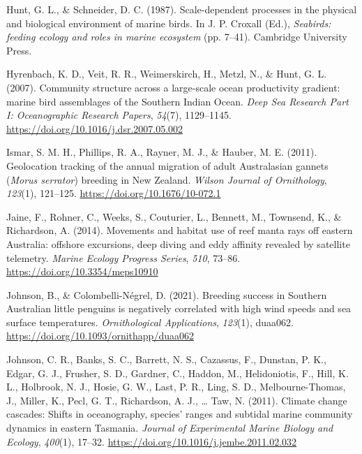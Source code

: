 \documentclass{article}
\newlength{\cslhangindent}
\newlength{\cslentryspacingunit} %
\newenvironment{CSLReferences}[2] %
 {%
  \setlength{\parindent}{0pt}
  \ifodd #1
  \let\oldpar\par
  \def\par{\hangindent=\cslhangindent\oldpar}
  \fi
  \setlength{\parskip}{#2\cslentryspacingunit}
 }%
 {}
\begin{document}
\begin{linenumbers}
\begin{CSLReferences}{1}{0}
\leavevmode{}%
Hunt, G. L., \& Schneider, D. C. (1987). Scale-dependent processes in the physical and biological environment of marine birds. In J. P. Croxall (Ed.), \emph{Seabirds: feeding ecology and roles in marine ecosystem} (pp. 7--41). Cambridge University Press.

\leavevmode{}%
Hyrenbach, K. D., Veit, R. R., Weimerskirch, H., Metzl, N., \& Hunt, G. L. (2007). Community structure across a large-scale ocean productivity gradient: marine bird assemblages of the Southern Indian Ocean. \emph{Deep Sea Research Part I: Oceanographic Research Papers}, \emph{54}(7), 1129--1145. \url{https://doi.org/10.1016/j.dsr.2007.05.002}

\leavevmode{}%
Ismar, S. M. H., Phillips, R. A., Rayner, M. J., \& Hauber, M. E. (2011). Geolocation tracking of the annual migration of adult Australasian gannets ({\emph{Morus serrator}}) breeding in New Zealand. \emph{Wilson Journal of Ornithology}, \emph{123}(1), 121--125. \url{https://doi.org/10.1676/10-072.1}

\leavevmode{}%
Jaine, F., Rohner, C., Weeks, S., Couturier, L., Bennett, M., Townsend, K., \& Richardson, A. (2014). Movements and habitat use of reef manta rays off eastern Australia: offshore excursions, deep diving and eddy affinity revealed by satellite telemetry. \emph{Marine Ecology Progress Series}, \emph{510}, 73--86. \url{https://doi.org/10.3354/meps10910}

\leavevmode{}%
Johnson, B., \& Colombelli-Négrel, D. (2021). Breeding success in Southern Australian little penguins is negatively correlated with high wind speeds and sea surface temperatures. \emph{Ornithological Applications}, \emph{123}(1), duaa062. \url{https://doi.org/10.1093/ornithapp/duaa062}

\leavevmode{}%
Johnson, C. R., Banks, S. C., Barrett, N. S., Cazassus, F., Dunstan, P. K., Edgar, G. J., Frusher, S. D., Gardner, C., Haddon, M., Helidoniotis, F., Hill, K. L., Holbrook, N. J., Hosie, G. W., Last, P. R., Ling, S. D., Melbourne-Thomas, J., Miller, K., Pecl, G. T., Richardson, A. J., \ldots{} Taw, N. (2011). Climate change cascades: Shifts in oceanography, species' ranges and subtidal marine community dynamics in eastern Tasmania. \emph{Journal of Experimental Marine Biology and Ecology}, \emph{400}(1), 17--32. \url{https://doi.org/10.1016/j.jembe.2011.02.032}


\end{CSLReferences}
\end{linenumbers}
\end{document}
